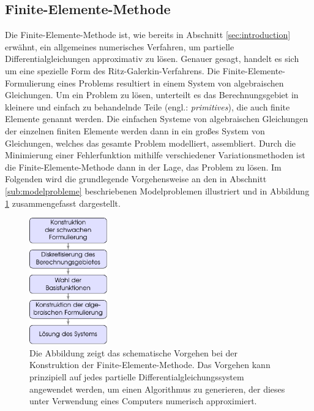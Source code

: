 \documentclass[crop=false]{standalone}
\begin{document}


    \subsection{Finite-Elemente-Methode} %
    \label{sub:finite_elemente_methode}
      Die Finite-Elemente-Methode ist, wie bereits in Abschnitt \ref{sec:introduction} erwähnt, ein allgemeines numerisches Verfahren, um partielle Differentialgleichungen approximativ zu lösen.
      Genauer gesagt, handelt es sich um eine spezielle Form des Ritz-Galerkin-Verfahrens.
      Die Finite-Elemente-Formulierung eines Problems resultiert in einem System von algebraischen Gleichungen.
      Um ein Problem zu lösen, unterteilt es das Berechnungsgebiet in kleinere und einfach zu behandelnde Teile (engl.: \textit{primitives}), die auch finite Elemente genannt werden.
      Die einfachen Systeme von algebraischen Gleichungen der einzelnen finiten Elemente werden dann in ein großes System von Gleichungen, welches das gesamte Problem modelliert, assembliert.
      Durch die Minimierung einer Fehlerfunktion mithilfe verschiedener Variationsmethoden ist die Finite-Elemente-Methode dann in der Lage, das Problem zu lösen.
      Im Folgenden wird die grundlegende Vorgehensweise an den in Abschnitt \ref{sub:modelprobleme} beschriebenen Modelproblemen illustriert und in Abbildung \ref{fig:fem-scheme} zusammengefasst dargestellt.
      \cite{Schweizer2013,Logan2007,Cheney2008,Quarteroni2000}

      \begin{figure}[h]
        \center
        \includegraphics[width=0.3\textwidth]{images/fem_scheme.pdf}
        \caption[Schematisches Vorgehen der Finite-Elemente-Methode]{%
          Die Abbildung zeigt das schematische Vorgehen bei der Konstruktion der Finite-Elemente-Methode.
          Das Vorgehen kann prinzipiell auf jedes partielle Differentialgleichungssystem angewendet werden, um einen Algorithmus zu generieren, der dieses unter Verwendung eines Computers numerisch approximiert.
        }
        \label{fig:fem-scheme}
      \end{figure}
\end{document}
